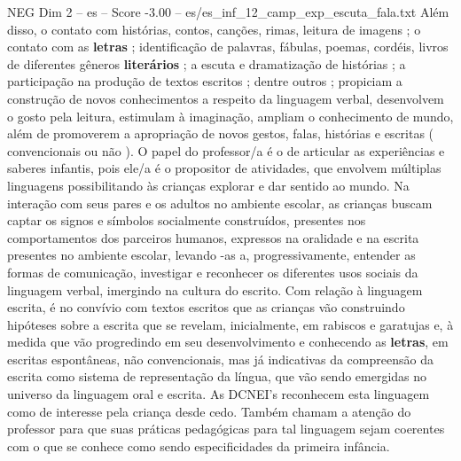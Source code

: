 \begin{textsample}{NEG Dim 2 – es – Score -3.00 – es/es\_inf\_12\_camp\_exp\_escuta\_fala.txt}
Além disso, o contato com histórias, contos, canções, rimas, leitura de imagens ; o contato com as \textbf{letras} ; identificação de palavras, fábulas, poemas, cordéis, livros de diferentes gêneros \textbf{literários} ; a escuta e dramatização de histórias ; a participação na produção de textos escritos ; dentre outros ; propiciam a construção de novos conhecimentos a respeito da linguagem verbal, desenvolvem o gosto pela leitura, estimulam à imaginação, ampliam o conhecimento de mundo, além de promoverem a apropriação de novos gestos, falas, histórias e escritas ( convencionais ou não ).
O papel do professor/a é o de articular as experiências e saberes infantis, pois ele/a é o propositor de atividades, que envolvem múltiplas linguagens possibilitando às crianças explorar e dar sentido ao mundo.
Na interação com seus pares e os adultos no ambiente escolar, as crianças buscam captar os signos e símbolos socialmente construídos, presentes nos comportamentos dos parceiros humanos, expressos na oralidade e na escrita presentes no ambiente escolar, levando -as a, progressivamente, entender as formas de comunicação, investigar e reconhecer os diferentes usos sociais da linguagem verbal, imergindo na cultura do escrito.
Com relação à linguagem escrita, é no convívio com textos escritos que as crianças vão construindo hipóteses sobre a escrita que se revelam, inicialmente, em rabiscos e garatujas e, à medida que vão progredindo em seu desenvolvimento e conhecendo as \textbf{letras}, em escritas espontâneas, não convencionais, mas já indicativas da compreensão da escrita como sistema de representação da língua, que vão sendo emergidas no universo da linguagem oral e escrita.
As DCNEI’s reconhecem esta linguagem como de interesse pela criança desde cedo.
Também chamam a atenção do professor para que suas práticas pedagógicas para tal linguagem sejam coerentes com o que se conhece como sendo especificidades da primeira infância.

\end{textsample}
